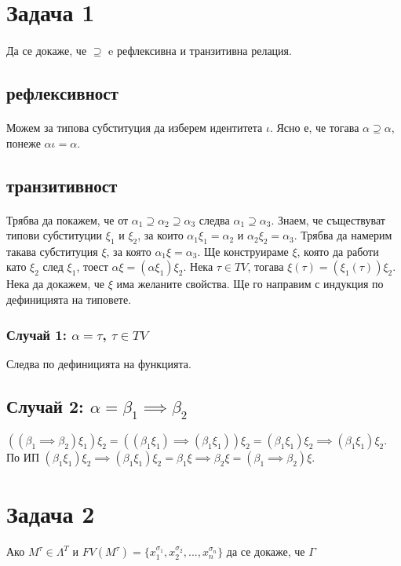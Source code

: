 \documentclass[12pt]{article}
\begin{document}
\newcommand\alphaeq{\mathrel{\stackrel{\makebox[0pt]{\mbox{\normalfont\tiny $\alpha$}}}{=}}}
\newcommand\betaeq{\mathrel{\stackrel{\makebox[0pt]{\mbox{\normalfont\tiny $\beta$}}}{=}}}
\newcommand\betaetaeq{\mathrel{\stackrel{\makebox[0pt]{\mbox{\normalfont\tiny $\beta\eta$}}}{=}}}

\section*{Задача 1}
\paragraph*{}
Да се докаже, че $\supseteq$ e рефлексивна и транзитивна релация.
\subsection*{рефлексивност}
\paragraph*{}
Можем за типова субституция да изберем идентитета $\iota$. Ясно е, че тогава $\alpha \supseteq \alpha$, понеже $\alpha \iota = \alpha$.
\subsection*{транзитивност}
\paragraph*{}
Трябва да покажем, че от $\alpha_1 \supseteq \alpha_2 \supseteq \alpha_3$ следва $\alpha_1 \supseteq \alpha_3$. Знаем, че съществуват типови субституции $\xi_1$ и $\xi_2$, за които $\alpha_1 \xi_1 = \alpha_2$ и $\alpha_2 \xi_2 = \alpha_3$. Трябва да намерим такава субституция $\xi$, за която $\alpha_1 \xi = \alpha_3$. Ще конструираме $\xi$, която да работи като $\xi_2$ след $\xi_1$, тоест $\alpha \xi = (\alpha \xi_1) \xi_2$. Нека $\tau \in TV$, тогава $\xi(\tau) = (\xi_1(\tau)) \xi_2$. Нека да докажем, че $\xi$ има желаните свойства. Ще го направим с индукция по дефиницията на типовете.
\subsubsection*{Случай 1: $\alpha = \tau$, $\tau \in TV$}
Следва по дефиницията на функцията.
\subsection*{Случай 2: $\alpha = \beta_1 \implies \beta_2$}
$((\beta_1 \implies \beta_2)\xi_1)\xi_2 = ((\beta_1 \xi_1) \implies (\beta_1 \xi_1))\xi_2 = (\beta_1 \xi_1) \xi_2 \implies (\beta_1 \xi_1) \xi_2$. По ИП $(\beta_1 \xi_1) \xi_2 \implies (\beta_1 \xi_1) \xi_2 = \beta_1 \xi \implies \beta_2 \xi = (\beta_1 \implies \beta_2)\xi$.

\section*{Задача 2}
\paragraph*{}
Ако $M^\tau \in \Lambda^T$ и $FV(M^\tau) = \{ x_1^{\sigma_1}, x_2^{\sigma_2}, ..., x_n^{\sigma_n}  \}$ да се докаже, че $\Gamma $
\end{document}
